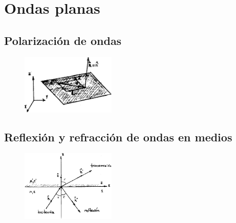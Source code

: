 \documentclass[10pt,oneside]{CBFT_book}
\begin{document}
\chapter{Ondas planas}



\section{Polarización de ondas}

\begin{figure}[htb]
	\begin{center}
	\includegraphics[width=0.4\textwidth]{images/fig_ft1_polariz.pdf}	 
	\end{center}
	\caption{}
\end{figure} 

\section{Reflexión y refracción de ondas en medios}

\begin{figure}[htb]
	\begin{center}
	\includegraphics[width=0.4\textwidth]{images/fig_ft1_reflex1.pdf}	 
	\end{center}
	\caption{}
\end{figure} 
\end{document}
